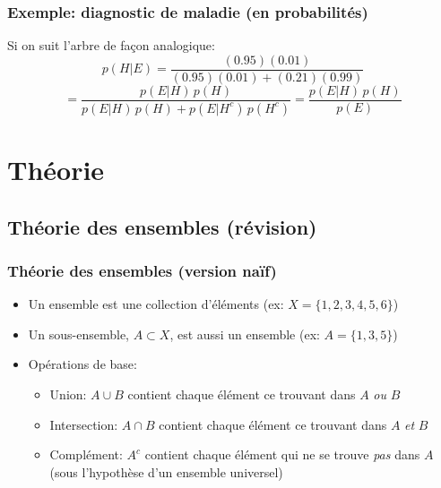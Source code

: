 \documentclass{beamer}
\begin{document}
\begin{frame}
    \frametitle{Exemple: diagnostic de maladie (en probabilités)}
    \begin{figure}
      \centering
      \scalebox{0.65}{}
    \end{figure}

    \pause

    Si on suit l'arbre de façon analogique:
    \[p(H | E) = \frac{(0.95)(0.01)}{(0.95)(0.01) + (0.21)(0.99)}\]
    \pause
    \[ = \frac{p(E | H) \, p(H)}{p(E | H) \, p(H) + p(E | H^c) \, p(H^c)} = \frac{p(E | H) \, p(H)}{p(E)}\]
\end{frame}



\section{Théorie}


\subsection{Théorie des ensembles (révision)}

\begin{frame}
  \frametitle{Théorie des ensembles (version naïf)}
  \begin{itemize}
    \item Un ensemble est une collection d'éléments (ex: $X = \{1,2,3,4,5,6\}$)
    \pause
    \item Un sous-ensemble, $A \subset X$, est aussi un ensemble (ex: $A = \{1,3,5\}$)
    \pause
    \item Opérations de base:
    \begin{itemize}
      \item Union: $A \cup B$ contient chaque élément ce trouvant dans $A$ \emph{ou} $B$
      \pause
      \item Intersection: $A \cap B$ contient chaque élément ce trouvant dans $A$ \emph{et} $B$
      \pause
      \item Complément: $A^c$ contient chaque élément qui ne se trouve \emph{pas} dans $A$ (sous l'hypothèse d'un ensemble universel)
    \end{itemize}
  \end{itemize}
\end{frame}


\end{document}
